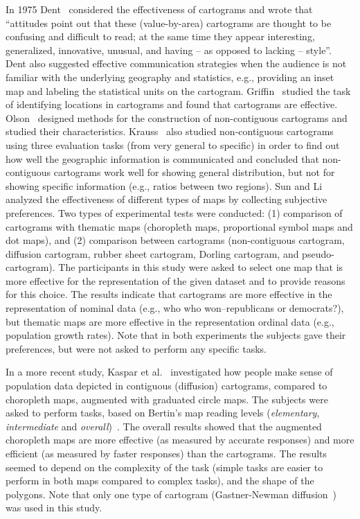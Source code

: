 \documentclass[10pt,journal,compsoc]{IEEEtran}
\begin{document}
In 1975 Dent~\cite{dent1975} considered the effectiveness of cartograms and wrote that ``attitudes point out that these (value-by-area) cartograms are thought to be confusing and difficult to read; at the same time they appear interesting, generalized, innovative, unusual, and having -- as opposed to lacking -- style''. Dent also suggested effective communication strategies when the audience is not familiar with the underlying geography and statistics, e.g., providing an inset map and labeling the statistical units on the cartogram.
Griffin~\cite{Gri83} studied the task of identifying locations in cartograms and found that cartograms are effective. Olson~\cite{Olson} designed methods for the construction of non-contiguous cartograms and studied their characteristics. 
Krauss~\cite{Krauss_ms} also studied non-contiguous cartograms
using three evaluation tasks (from very general to specific) in order to find out how well the geographic information is communicated and concluded that non-contiguous cartograms work well for showing general distribution, but not for showing specific information (e.g., ratios between two regions). 
Sun and Li~\cite{Hui} analyzed the effectiveness of different types of maps by collecting subjective preferences. Two types of experimental tests were conducted: (1) comparison of cartograms with thematic maps (choropleth maps, proportional symbol maps and dot maps), and (2) comparison between cartograms (non-contiguous cartogram, diffusion cartogram, rubber sheet cartogram, Dorling cartogram, and pseudo-cartogram). 
The participants in this study were  asked to select one map that is more effective for the representation of the given dataset and to provide reasons for this choice. 
The results indicate that cartograms are more effective in the representation of nominal data 
(e.g., who who won--republicans or democrats?), but thematic maps are more effective in the representation ordinal data (e.g., population growth rates). Note that in both experiments the subjects gave their preferences, but were not asked to perform any specific tasks.   



In a more recent study, Kaspar et al.~\cite{kaspar2013empirical} investigated how people make sense of population data depicted in contiguous (diffusion) cartograms, compared to choropleth maps, augmented with graduated circle maps. The subjects were asked to perform tasks, based on Bertin's map reading levels (\textit{elementary}, \textit{intermediate} and \textit{overall})~\cite{BERTIN83}. The overall results showed that the augmented choropleth maps are more effective (as measured by accurate responses) and more efficient (as measured by faster responses) than the cartograms.
The results seemed to depend on the complexity of the task (simple tasks are easier to perform in both maps compared to complex tasks), and the shape of the polygons. Note that only one type of cartogram (Gastner-Newman diffusion~\cite{GN04}) was used in this study.
\end{document}
